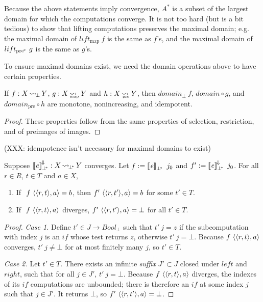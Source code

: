 \documentclass[preprint]{sigplanconf}
\newcommand{\arrow}{\rightsquigarrow}
\newcommand{\conv}{^{\mspace{-2mu}\Downarrow\mspace{-2mu}}}
\newcommand{\meaningofconv}[1]{\left\llbracket{#1}\right\rrbracket\conv}
\newcommand{\arrowlift}{\ensuremath{lift}}
\DeclareMathOperator{\botto}{\arrow_{\mspace{-3mu}\bot}}
\newcommand{\map}{_\mathrm{map}}
\DeclareMathOperator{\mapto}{\arrow_{\mspace{-21mu}\map}}
\newcommand{\liftmap}{\arrowlift\map}
\newcommand{\pre}{_\mathrm{pre}}
\DeclareMathOperator{\preto}{\arrow_{\mspace{-19mu}\pre}}
\newcommand{\pbot}{{\bot^{\mspace{-4mu}*}}}
\DeclareMathOperator{\pbotto}{\arrow_{\mspace{-3mu}\pbot}}
\newcommand{\ppre}{_\mathrm{pre^{\mspace{-2mu}*}}}
\newcommand{\liftppre}{\arrowlift\ppre}
\begin{document}
Because the above statements imply convergence, $A^*$ is a subset of the largest domain for which the computations converge.
It is not too hard (but is a bit tedious) to show that lifting computations preserves the maximal domain; e.g. the maximal domain of $\liftmap~f$ is the same as $f$'s, and the maximal domain of $\liftppre~g$ is the same as $g$'s.

To ensure maximal domains exist, we need the domain operations above to have certain properties.

\begin{theorem}
If $f : X \botto Y$, $g : X \mapto Y$ and $h : X \preto Y$, then $domain_\bot~f$, $domain \circ g$, and $domain\pre \circ h$ are monotone, nonincreasing, and idempotent.
\label{thm:domain-closure-operators}
\end{theorem}
\begin{proof}
These properties follow from the same properties of selection, restriction, and of preimages of images.
\end{proof}

(XXX: idempotence isn't necessary for maximal domains to exist)

\begin{theorem}
Suppose $\meaningofconv{\mathit{e}}_\pbot : X \pbotto Y$ converges.
Let $f := \meaningof{\mathit{e}}_\pbot~j_0$ and $f' := \meaningofconv{\mathit{e}}_\pbot~j_0$.
For all $r \in R$, $t \in T$ and $a \in X$,
\begin{enumerate}
	\item If $~f~\langle{\langle{r,t}\rangle,a}\rangle = b$, then $f'~\langle{\langle{r,t'}\rangle,a}\rangle = b$ for some $t' \in T$.
	\item If $~f~\langle{\langle{r,t}\rangle,a}\rangle$ diverges, $f'~\langle{\langle{r,t'}\rangle,a}\rangle = \bot$ for all $t' \in T$.
\end{enumerate}
\end{theorem}
\begin{proof}
\emph{Case 1.}
Define $t' \in J \to Bool_\bot$ such that $t'~j = z$ if the subcomputation with index $j$ is an $if$ whose test returns $z$, otherwise $t'~j = \bot$.
Because $f~\langle{\langle{r,t}\rangle,a}\rangle$ converges, $t'~j \neq \bot$ for at most finitely many $j$, so $t' \in T$.

\emph{Case 2.}
Let $t' \in T$.
There exists an infinite \emph{suffix} $J' \subset J$ closed under $left$ and $right$, such that for all $j \in J'$, $t'~j = \bot$.
Because $f~\langle{\langle{r,t}\rangle,a}\rangle$ diverges, the indexes of its $if$ computations are unbounded; there is therefore an $if$ at some index $j$ such that $j \in J'$.
It returns $\bot$, so $f'~\langle{\langle{r,t'}\rangle,a}\rangle = \bot$.
\end{proof}
\end{document}
